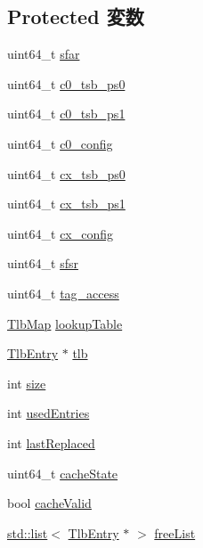 \subsection*{Protected 変数}
\begin{DoxyCompactItemize}
\item 
uint64\_\-t \hyperlink{classSparcISA_1_1TLB_a81cff85924ab4191c84c9818d90eb0a2}{sfar}
\item 
uint64\_\-t \hyperlink{classSparcISA_1_1TLB_ac1b9fd2f6c65e41f4f5b85b1b50d3a4e}{c0\_\-tsb\_\-ps0}
\item 
uint64\_\-t \hyperlink{classSparcISA_1_1TLB_a1ab61f1741b5a3c2f81fe87fe3908e7e}{c0\_\-tsb\_\-ps1}
\item 
uint64\_\-t \hyperlink{classSparcISA_1_1TLB_a9395cf2ea615ba767ab8a677ee13d29c}{c0\_\-config}
\item 
uint64\_\-t \hyperlink{classSparcISA_1_1TLB_a3a0b3ccfe08de626e122e8db329e6cde}{cx\_\-tsb\_\-ps0}
\item 
uint64\_\-t \hyperlink{classSparcISA_1_1TLB_a1551a0ec5dad394042a5f1384b582ff3}{cx\_\-tsb\_\-ps1}
\item 
uint64\_\-t \hyperlink{classSparcISA_1_1TLB_a7388d84b8f9e8e4f6c8b3b8723d12b4a}{cx\_\-config}
\item 
uint64\_\-t \hyperlink{classSparcISA_1_1TLB_aa93fbd043dbccd30bf6f78f83bb088eb}{sfsr}
\item 
uint64\_\-t \hyperlink{classSparcISA_1_1TLB_a5d2c5251a072e8aef04cf78fdd6432d7}{tag\_\-access}
\item 
\hyperlink{classSparcISA_1_1TlbMap}{TlbMap} \hyperlink{classSparcISA_1_1TLB_ac52ea914d25a72d4c33298b8d64603c1}{lookupTable}
\item 
\hyperlink{structSparcISA_1_1TlbEntry}{TlbEntry} $\ast$ \hyperlink{classSparcISA_1_1TLB_a4651b9a4f432960d77d8e3d30175aab3}{tlb}
\item 
int \hyperlink{classSparcISA_1_1TLB_a439227feff9d7f55384e8780cfc2eb82}{size}
\item 
int \hyperlink{classSparcISA_1_1TLB_ad85f3aef77516b13c75af59a1887f8b7}{usedEntries}
\item 
int \hyperlink{classSparcISA_1_1TLB_a943cc0b274cf0720dad94d3469de39c3}{lastReplaced}
\item 
uint64\_\-t \hyperlink{classSparcISA_1_1TLB_a426d36e3a37393acd76bb3f1b14c2be9}{cacheState}
\item 
bool \hyperlink{classSparcISA_1_1TLB_a7d50962c0e8dea3232b1929d48065a3d}{cacheValid}
\item 
\hyperlink{classstd_1_1list}{std::list}$<$ \hyperlink{structSparcISA_1_1TlbEntry}{TlbEntry} $\ast$ $>$ \hyperlink{classSparcISA_1_1TLB_aa3dc4ef7249a728d9d8d717427985532}{freeList}
\end{DoxyCompactItemize}
